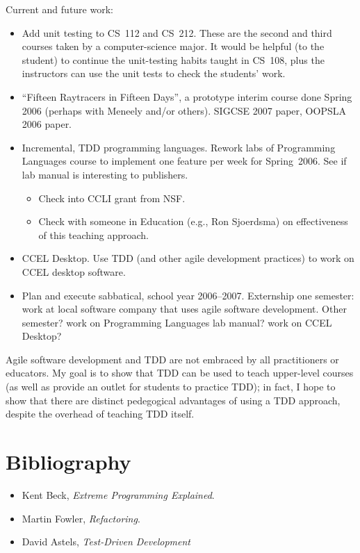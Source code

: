 \documentclass{article}
\begin{document}
Current and future work:
\begin{itemize}
\item Add unit testing to CS~112 and CS~212.  These are the second and third courses taken by a computer-science major.  It would be helpful (to the student) to continue the unit-testing habits taught in CS~108, plus the instructors can use the unit tests to check the students' work.
\item ``Fifteen Raytracers in Fifteen Days'', a prototype interim course done Spring 2006 (perhaps with Meneely and/or others).  SIGCSE 2007 paper, OOPSLA 2006 paper.
\item Incremental, TDD programming languages.  Rework labs of Programming Languages course to implement one feature per week for Spring~2006.  See if lab manual is interesting to publishers.
  \begin{itemize}
  \item Check into CCLI grant from NSF.
  \item Check with someone in Education (e.g., Ron Sjoerdsma) on effectiveness of this teaching approach.
  \end{itemize}
\item CCEL Desktop.  Use TDD (and other agile development practices) to work on CCEL desktop software.
\item Plan and execute sabbatical, school year 2006--2007.  Externship one semester: work at local software company that uses agile software development.  Other semester? work on Programming Languages lab manual? work on CCEL Desktop?
\end{itemize}

Agile software development and TDD are not embraced by all practitioners or educators.  My goal is to show that TDD can be used to teach upper-level courses (as well as provide an outlet for students to practice TDD); in fact, I hope to show that there are distinct pedegogical advantages of using a TDD approach, despite the overhead of teaching TDD itself.

\section*{Bibliography}

\begin{itemize}
\item Kent Beck, \textit{Extreme Programming Explained}.
\item Martin Fowler, \textit{Refactoring}.
\item David Astels, \textit{Test-Driven Development}
\end{itemize}
\end{document}
